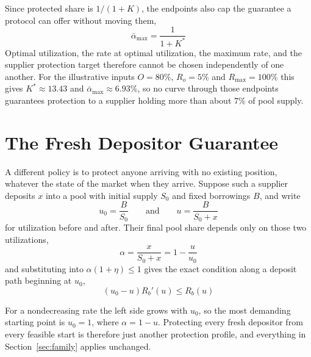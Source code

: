 \documentclass[11pt,a4paper]{article}
\begin{document}
Since protected share is $1/(1+K)$, the endpoints also cap the guarantee a protocol can offer without moving them,
\begin{equation}
\boxed{
\bar\alpha_{\max}=\frac{1}{1+K^*}
}
\end{equation}
Optimal utilization, the rate at optimal utilization, the maximum rate, and the supplier protection target therefore cannot be chosen independently of one another. For the illustrative inputs $O=80\%$, $R_o=5\%$ and $R_{\max}=100\%$ this gives $K^*\approx13.43$ and $\bar\alpha_{\max}\approx6.93\%$, so no curve through those endpoints guarantees protection to a supplier holding more than about $7\%$ of pool supply.

\section{The Fresh Depositor Guarantee}
\label{sec:fresh}

A different policy is to protect anyone arriving with no existing position, whatever the state of the market when they arrive. Suppose such a supplier deposits $x$ into a pool with initial supply $S_0$ and fixed borrowings $B$, and write
\begin{equation}
u_0=\frac{B}{S_0}
\qquad\text{and}\qquad
u=\frac{B}{S_0+x}
\end{equation}
for utilization before and after. Their final pool share depends only on those two utilizations,
\begin{equation}
\alpha=\frac{x}{S_0+x}=1-\frac{u}{u_0}
\end{equation}
and substituting into $\alpha(1+\eta)\leq1$ gives the exact condition along a deposit path beginning at $u_0$,
\begin{equation}
\boxed{(u_0-u)R_b'(u)\leq R_b(u)}
\end{equation}

For a nondecreasing rate the left side grows with $u_0$, so the most demanding starting point is $u_0=1$, where $\alpha=1-u$. Protecting every fresh depositor from every feasible start is therefore just another protection profile, and everything in Section~\ref{sec:family} applies unchanged.
\end{document}

